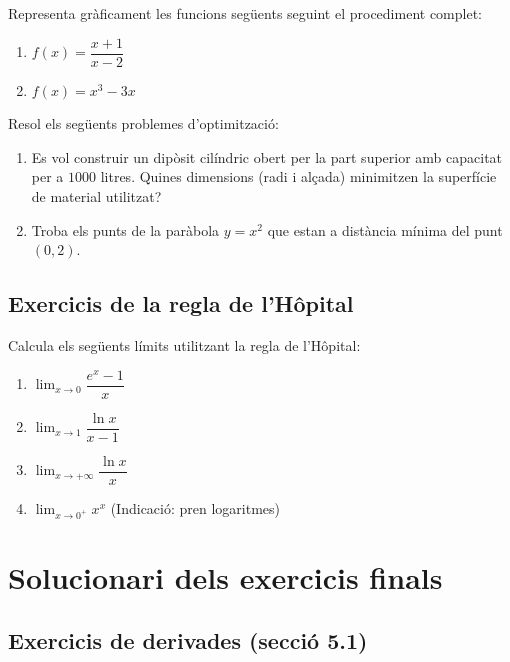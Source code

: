 \documentclass[12pt]{article}
\begin{document}
\begin{exercici}
Representa gràficament les funcions següents seguint el procediment complet:
\begin{enumerate}
    \item $f(x)=\dfrac{x+1}{x-2}$
    \item $f(x)=x^3-3x$
\end{enumerate}
\end{exercici}

\begin{exercici}
Resol els següents problemes d'optimització:
\begin{enumerate}
    \item Es vol construir un dipòsit cilíndric obert per la part superior amb capacitat per a $1000$ litres. Quines dimensions (radi i alçada) minimitzen la superfície de material utilitzat?
    \item Troba els punts de la paràbola $y=x^2$ que estan a distància mínima del punt $(0,2)$.
\end{enumerate}
\end{exercici}

\subsection{Exercicis de la regla de l'Hôpital}

\begin{exercici}
Calcula els següents límits utilitzant la regla de l'Hôpital:
\begin{enumerate}
    \item $\displaystyle \lim_{x\to 0} \dfrac{e^x-1}{x}$
    \item $\displaystyle \lim_{x\to 1} \dfrac{\ln x}{x-1}$
    \item $\displaystyle \lim_{x\to +\infty} \dfrac{\ln x}{x}$
    \item $\displaystyle \lim_{x\to 0^+} x^x$ (Indicació: pren logaritmes)
\end{enumerate}
\end{exercici}

\section*{Solucionari dels exercicis finals}

\subsection*{Exercicis de derivades (secció 5.1)}
\end{document}
